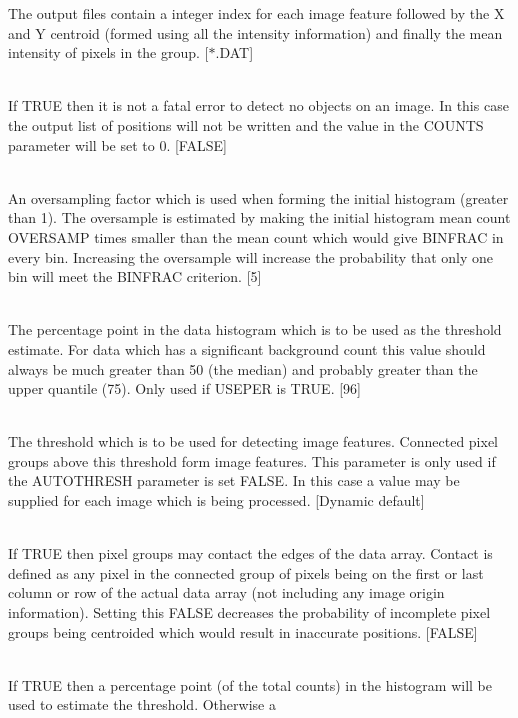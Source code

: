 \documentclass[twoside,11pt]{article}
\renewcommand{\_}{\texttt{\symbol{95}}}
\newcommand{\sstsubsection}[1]{ \item[{#1}] \mbox{} \\}
\newcommand{\sstsubsection}[1]{\item[{#1}]}
\begin{document}
{{{         The output files contain a integer index for each image
         feature followed by the X and Y centroid (formed using all the
         intensity information) and finally the mean intensity of
         pixels in the group.
         [$*$.DAT]
      }
      \sstsubsection{
         OVERRIDE = \_LOGICAL (Read)
      } {
         If TRUE then it is not a fatal error to detect no objects on an 
         image. In this case the output list of positions will not be
         written and the value in the COUNTS parameter will be set to 0.
         [FALSE]
      }
      \sstsubsection{
         OVERSAMP = \_INTEGER (Read)
      } {
         An oversampling factor which is used when forming the initial
         histogram (greater than 1). The oversample is estimated by
         making the initial histogram mean count OVERSAMP times
         smaller than the mean count which would give BINFRAC in every
         bin. Increasing the oversample will increase the probability
         that only one bin will meet the BINFRAC criterion.
         [5]
      }
      \sstsubsection{
         PERCENTILE = \_DOUBLE (Read)
      } {
         The percentage point in the data histogram which is to be used
         as the threshold estimate.  For data which has a significant
         background count this value should always be much greater than
         50 (the median) and probably greater than the upper quantile
         (75). Only used if USEPER is TRUE.
         [96]
      }
      \sstsubsection{
         THRESH = \_DOUBLE (Read)
      } {
         The threshold which is to be used for detecting image
         features.  Connected pixel groups above this threshold form
         image features. This parameter is only used if the AUTOTHRESH
         parameter is set FALSE. In this case a value may be supplied
         for each image which is being processed.
         [Dynamic default]
      }
      \sstsubsection{
         TOUCH = \_LOGICAL (Read)
      } {
         If TRUE then pixel groups may contact the edges of the data
         array. Contact is defined as any pixel in the connected group
         of pixels being on the first or last column or row of the
         actual data array (not including any image origin information).
         Setting this FALSE decreases the probability of incomplete
         pixel groups being centroided which would result in inaccurate
         positions.
         [FALSE]
      }
      \sstsubsection{
         USEPER = \_LOGICAL (Read)
      } {
         If TRUE then a percentage point (of the total counts) in the
         histogram will be used to estimate the threshold. Otherwise a
}}}
\end{document}
